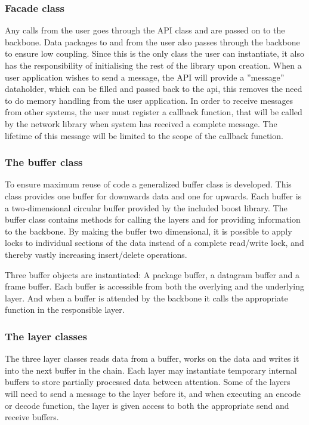 \subsubsection{Facade class}
Any calls from the user goes through the API class and are passed on to the backbone. Data packages to and from the user also passes through the backbone to ensure low coupling. Since this is the only class the user can instantiate, it also has the responsibility of initialising the rest of the library upon creation.
When a user application wishes to send a message, the API will provide a ''message'' dataholder, which can be filled and passed back to the api, this removes the need to do memory handling from the user application.
In order to receive messages from other systems, the user must register a callback function, that will be called by the network library when system has received a complete message. The lifetime of this message will be limited to the scope of the callback function.

\subsubsection{The buffer class}
To ensure maximum reuse of code a generalized buffer class is developed. This class provides one buffer for downwards data and one for upwards. Each buffer is a two-dimensional circular buffer provided by the included boost library. The buffer class contains methods for calling the layers and for providing information to the backbone.
By making the buffer two dimensional, it is possible to apply locks to individual sections of the data instead of a complete read/write lock, and thereby vastly increasing insert/delete operations.

Three  buffer objects are instantiated: A package buffer, a datagram buffer and a frame buffer. Each buffer is accessible from both the overlying and the underlying layer. And when a buffer is attended by the backbone it calls the appropriate function in the responsible layer.

\subsubsection{The layer classes}
The three layer classes reads data from a buffer, works on the data and writes it into the next buffer in the chain. Each layer may instantiate temporary internal buffers to store partially processed data between attention. Some of the layers will need to send a message to the layer before it, and when executing an encode or decode function, the layer is given access to both the appropriate send and receive buffers.

